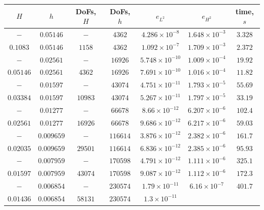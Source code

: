 \begin{table}
  \begin{center}
    {\small
    \begin{tabular}{|c|c|c|c|c|c|c|}
      \hline
        $H$ & $h$    & DoFs, $H$ & DoFs, $h$ & $e_{L^2}$ & $e_{H^2}$ & time, $s$ \\
      \hline
      $-$         & $0.05146$   & $-$       & $4362$    & $4.286\times 10^{-8}$
        & $1.648\times 10^{-3}$ & $3.328$ \\
      $0.1083$    & $0.05146$   & $1158$    & $4362$    & $1.092\times 10^{-7}$
        & $1.709\times 10^{-3}$            & $2.372$ \\
      $-$         & $0.02561$   & $-$       & $16926$   & $5.748\times 10^{-10}$
        & $1.009\times 10^{-4}$ & $19.92$ \\
      $0.05146$   & $0.02561$   & $4362$    & $16926$   & $7.691\times 10^{-10}$
        & $1.016\times 10^{-4}$           & $11.82$ \\
      $-$         & $0.01597$   & $-$       & $43074$   & $4.751\times 10^{-11}$
        & $1.793\times 10^{-5}$ & $55.69$ \\
      $0.03384$   & $0.01597$   & $10983$   & $43074$   & $5.267\times 10^{-11}$
        & $1.797\times 10^{-5}$ & $33.19$ \\
      $-$         & $0.01277$   & $-$       & $66678$   & $8.66\times 10^{-12}$
        & $6.207\times 10^{-6}$ & $102.4$ \\
      $0.02561$   & $0.01277$   & $16926$   & $66678$   & $9.686\times 10^{-12}$
        & $6.217\times 10^{-6}$ & $59.03$ \\
      $-$         & $0.009659$  & $-$       & $116614$  & $3.876\times 10^{-12}$
        & $2.382\times 10^{-6}$ & $161.7$ \\
      $0.02035$   & $0.009659$  & $29501$   & $116614$  & $6.836\times 10^{-12}$
        & $2.385\times 10^{-6}$ & $95.93$ \\
      $-$         & $0.007959$  & $-$       & $170598$  & $4.791\times 10^{-12}$
        & $1.111\times 10^{-6}$ & $325.1$ \\
      $0.01597$   & $0.007959$  & $43074$   & $170598$  & $9.087\times 10^{-12}$
        & $1.112\times 10^{-6}$ & $172.3$ \\
      $-$         & $0.006854$  & $-$       & $230574$  & $1.79\times 10^{-11}$
        & $6.16\times 10^{-7}$ & $401.7$ \\
      $0.01436$   & $0.006854$  & $58131$   & $230574$  & $1.3\times 10^{-11}$

\end{tabular}}
\end{center}
\end{table}
